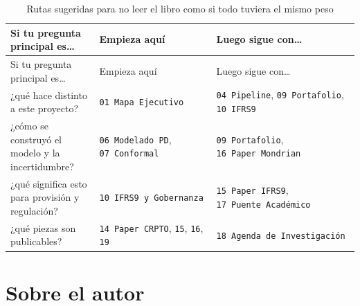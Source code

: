 \documentclass[
  spanish,
  11pt,
  letterpaper,
]{scrbook}
\theoremstyle{plain}
\theoremstyle{remark}
\begin{document}
\begin{longtable}[]{@{}
  >{\raggedright\arraybackslash}p{}
  >{\raggedright\arraybackslash}p{}
  >{\raggedright\arraybackslash}p{}@{}}
\caption{Rutas sugeridas para no leer el libro como si todo tuviera el
mismo peso}\label{tbl-reading-routes}\tabularnewline
\toprule\noalign{}
\begin{minipage}[b]{\linewidth}\raggedright
Si tu pregunta principal es\ldots{}
\end{minipage} & \begin{minipage}[b]{\linewidth}\raggedright
Empieza aquí
\end{minipage} & \begin{minipage}[b]{\linewidth}\raggedright
Luego sigue con\ldots{}
\end{minipage} \\
\midrule\noalign{}
\endfirsthead
\toprule\noalign{}
\begin{minipage}[b]{\linewidth}\raggedright
Si tu pregunta principal es\ldots{}
\end{minipage} & \begin{minipage}[b]{\linewidth}\raggedright
Empieza aquí
\end{minipage} & \begin{minipage}[b]{\linewidth}\raggedright
Luego sigue con\ldots{}
\end{minipage} \\
\midrule\noalign{}
\endhead
\bottomrule\noalign{}
\endlastfoot
¿qué hace distinto a este proyecto? & \texttt{01\ Mapa\ Ejecutivo} &
\texttt{04\ Pipeline}, \texttt{09\ Portafolio}, \texttt{10\ IFRS9} \\
¿cómo se construyó el modelo y la incertidumbre? &
\texttt{06\ Modelado\ PD}, \texttt{07\ Conformal} &
\texttt{09\ Portafolio}, \texttt{16\ Paper\ Mondrian} \\
¿qué significa esto para provisión y regulación? &
\texttt{10\ IFRS9\ y\ Gobernanza} & \texttt{15\ Paper\ IFRS9},
\texttt{17\ Puente\ Académico} \\
¿qué piezas son publicables? & \texttt{14\ Paper\ CRPTO}, \texttt{15},
\texttt{16}, \texttt{19} & \texttt{18\ Agenda\ de\ Investigación} \\
\end{longtable}

\section{Sobre el autor}\label{sobre-el-autor}
\end{document}
